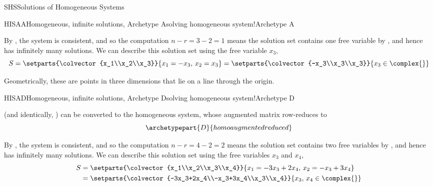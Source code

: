 \begin{subsect}{SHS}{Solutions of Homogeneous Systems}
\begin{example}{HISAA}{Homogeneous, infinite solutions, Archetype A}{solving homogeneous system!Archetype A}
%
\begin{para}By , the system is consistent, and so the computation $n-r=3-2=1$ means the solution set contains one free variable by , and hence has infinitely many solutions.  We can describe this solution set using the free variable $x_3$,
\begin{equation*}
S=\setparts{\colvector{x_1\\x_2\\x_3}}{x_1=-x_3,\,x_2=x_3}
=\setparts{\colvector{-x_3\\x_3\\x_3}}{x_3\in\complex{\null}}
\end{equation*}
\end{para}
%
\begin{para}Geometrically, these are points in three dimensions that lie on a line through the origin.\end{para}
%
\end{example}
%
\begin{example}{HISAD}{Homogeneous, infinite solutions, Archetype D}{solving homogeneous system!Archetype D}
\begin{para} (and identically, ) can be converted to the homogeneous system,
%
%
whose augmented matrix row-reduces to
%
\begin{equation*}
\archetypepart{D}{homoaugmentedreduced}\end{equation*}\end{para}
%
\begin{para}By , the system is consistent, and so the computation $n-r=4-2=2$ means the solution set contains two free variables by , and hence has infinitely many solutions.  We can describe this solution set using the free variables $x_3$ and $x_4$,
\begin{align*}
S&=\setparts{\colvector{x_1\\x_2\\x_3\\x_4}}{x_1=-3x_3+2x_4,\,x_2=-x_3+3x_4}\\
 &=\setparts{\colvector{-3x_3+2x_4\\-x_3+3x_4\\x_3\\x_4}}{ x_3,\,x_4\in\complex{\null}}\\
\end{align*}

\end{para}
\end{example}
\end{subsect}
